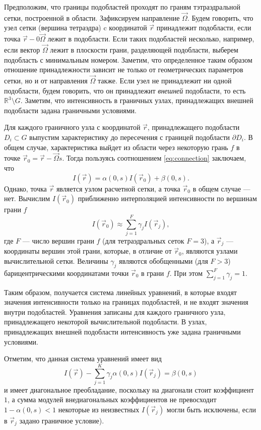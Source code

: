 Предположим, что границы подобластей проходят по граням тэтраэдральной сетки, построенной в области. Зафиксируем направление $\vec \Omega$. Будем говорить, что узел сетки (вершина тетраэдра) c координатой $\vec r$ принадлежит подобласти, если точка $\vec r - 0 \vec\Omega$ лежит в подобласти. Если таких подобластей несколько, например, если вектор $\vec \Omega$ лежит в плоскости грани, разделяющей подобласти, выберем подобласть с минимальным номером. Заметим, что определенное таким образом отношение принадлежности зависит не только от геометрических параметров сетки, но и от направления $\vec \Omega$ также. Если узел не принадлежит ни одной подобласти, будем говорить, что он принадлежит \emph{внешней} подобласти, то есть $\mathbb R^3 \setminus G$. Заметим, что интенсивность в граничных узлах, принадлежащих внешней подобласти задана граничными условиями.

Для каждого граничного узла с координатой $\vec r$, принадлежащего подобласти $D_i \subset G$ выпустим характеристику до пересечения с границей подобласти $\partial D_i$. В общем случае, характеристика выйдет из области через некоторую грань $f$ в точке $\vec r_0 = \vec r - \vec \Omega s$. 
Тогда пользуясь соотношением \eqref{eq:connection} заключаем, что
\[
I(\vec r) = \alpha(0, s) I(\vec r_0) + \beta(0, s).
\]
Однако, точка $\vec r$ является узлом расчетной сетки, а точка $\vec r_0$ в общем случае --- нет. Вычислим $I(\vec r_0)$ приближенно интерполяцией интенсивности по вершинам грани $f$
\[
I(\vec r_0) \approx \sum_{j=1}^F \gamma_j I(\vec r_j),
\]
где $F$ --- число вершин грани $f$ (для тетраэдральных сеток $F = 3$), а $\vec r_j$ --- координаты вершин этой грани, которые, в отличие от $\vec r_0$, являются узлами вычислительной сетки. Величины $\gamma_j$ являются обобщенными (для $F > 3$) барицентрическими координатами точки $\vec r_0$ в грани $f$. При этом $\sum_{j=1}^F \gamma_j = 1$.

Таким образом, получается система линейных уравнений, в которые входят значения интенсивности только на границах подобластей, и не входят значения внутри подобластей. Уравнения записаны для каждого граничного узла, принадлежащего некоторой вычислительной подобласти. В узлах, принадлежащих внешней подобласти интенсивность уже задана граничными условиями.

Отметим, что данная система уравнений имеет вид
\begin{equation}
I(\vec r) - \sum_{j=1}^K \gamma_j \alpha(0, s) I(\vec r_j) = \beta(0, s)
\label{eq:slae}
\end{equation}
и имеет диагональное преобладание, поскольку на диагонали стоит коэффициент $1$, а сумма модулей внедиагональных коэффициентов не превосходит $1 - \alpha(0, s) < 1$ некоторые из неизвестных $I(\vec r_j)$ могли быть исключены, если в $\vec r_j$ задано граничное условие).

